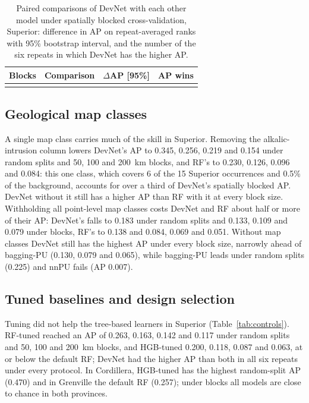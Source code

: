 \documentclass[pdflatex,sn-apa]{sn-jnl}
\begin{document}
\begin{table}[t]
\caption{Paired comparisons of DevNet with each other model under spatially blocked cross-validation, Superior: difference in AP on repeat-averaged ranks with 95\% bootstrap interval, and the number of the six repeats in which DevNet has the higher AP.}\label{tab:spatial-boot}
\footnotesize
\begin{tabular*}{\textwidth}{@{\extracolsep\fill}llcc}
\toprule
Blocks & Comparison & $\Delta$AP [95\%] & AP wins \\
\midrule
\botrule
\end{tabular*}
\end{table}

\subsection{Geological map classes}\label{sec:res-featuresets}

A single map class carries much of the skill in Superior. Removing the alkalic-intrusion column lowers DevNet's AP to 0.345, 0.256, 0.219 and 0.154 under random splits and 50, 100 and 200~km blocks, and RF's to 0.230, 0.126, 0.096 and 0.084: this one class, which covers 6 of the 15 Superior occurrences and 0.5\% of the background, accounts for over a third of DevNet's spatially blocked AP. DevNet without it still has a higher AP than RF with it at every block size. Withholding all point-level map classes costs DevNet and RF about half or more of their AP: DevNet's falls to 0.183 under random splits and 0.133, 0.109 and 0.079 under blocks, RF's to 0.138 and 0.084, 0.069 and 0.051. Without map classes DevNet still has the highest AP under every block size, narrowly ahead of bagging-PU (0.130, 0.079 and 0.065), while bagging-PU leads under random splits (0.225) and nnPU fails (AP 0.007).

\subsection{Tuned baselines and design selection}\label{sec:res-controls}

Tuning did not help the tree-based learners in Superior (Table~\ref{tab:controls}). RF-tuned reached an AP of 0.263, 0.163, 0.142 and 0.117 under random splits and 50, 100 and 200~km blocks, and HGB-tuned 0.200, 0.118, 0.087 and 0.063, at or below the default RF; DevNet had the higher AP than both in all six repeats under every protocol. In Cordillera, HGB-tuned has the highest random-split AP (0.470) and in Grenville the default RF (0.257); under blocks all models are close to chance in both provinces.
\end{document}
